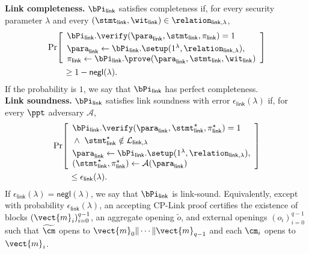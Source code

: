 \noindent\textbf{Link completeness.}
\(\bPi_{\mathsf{link}}\) satisfies completeness if, for every security
parameter \(\lambda\) and every
\((\stmt_{\mathsf{link}},\wit_{\mathsf{link}})
\in\relation_{\mathsf{link},\lambda}\),
\[
\begin{aligned}
&\Pr\!\left[
\begin{array}{l}
  \bPi_{\mathsf{link}}.\verify(
    \para_{\mathsf{link}},
    \stmt_{\mathsf{link}},
    \pi_{\mathsf{link}}
  )=1
  \\[1mm]
  \para_{\mathsf{link}}
    \gets
    \bPi_{\mathsf{link}}.\setup(
      1^\lambda,\relation_{\mathsf{link},\lambda}
    ),\\
  \pi_{\mathsf{link}}
    \gets
    \bPi_{\mathsf{link}}.\prove(
      \para_{\mathsf{link}},
      \stmt_{\mathsf{link}},
      \wit_{\mathsf{link}}
    )
\end{array}
\right]
\\
&\hspace{2em}\ge 1-\textsf{negl}(\lambda).
\end{aligned}
\]
If the probability is \(1\), we say that
\(\bPi_{\mathsf{link}}\) has perfect completeness. \\

\noindent\textbf{Link soundness.}
\(\bPi_{\mathsf{link}}\) satisfies link soundness with error
\(\epsilon_{\mathsf{link}}(\lambda)\) if, for every \(\ppt\) adversary
\(\mathcal{A}\),
\[
\begin{aligned}
&\Pr\!\left[
\begin{array}{l}
  \bPi_{\mathsf{link}}.\verify(
    \para_{\mathsf{link}},
    \stmt_{\mathsf{link}}^\star,
    \pi_{\mathsf{link}}^\star
  )=1
  \\[1mm]
  {}\wedge{}\ 
  \stmt_{\mathsf{link}}^\star
  \notin
  \mathcal{L}_{\mathsf{link},\lambda}
  \\[1mm]
  \para_{\mathsf{link}}
    \gets
    \bPi_{\mathsf{link}}.\setup(
      1^\lambda,\relation_{\mathsf{link},\lambda}
    ),\\
  (\stmt_{\mathsf{link}}^\star,\pi_{\mathsf{link}}^\star)
    \gets
    \mathcal{A}(\para_{\mathsf{link}})
\end{array}
\right]
\\
&\hspace{2em}\le \epsilon_{\mathsf{link}}(\lambda).
\end{aligned}
\]
If \(\epsilon_{\mathsf{link}}(\lambda)=\textsf{negl}(\lambda)\), we say that
\(\bPi_{\mathsf{link}}\) is link-sound.  Equivalently, except with probability
\(\epsilon_{\mathsf{link}}(\lambda)\), an accepting CP-Link proof certifies the
existence of blocks \((\vect{m}_i)_{i=0}^{q-1}\), an aggregate opening
\(\widetilde{o}\), and external openings \((o_i)_{i=0}^{q-1}\) such that
\(\widetilde{\cm}\) opens to
\(\vect{m}_0\|\cdots\|\vect{m}_{q-1}\) and each \(\cm_i\) opens to
\(\vect{m}_i\). \\

